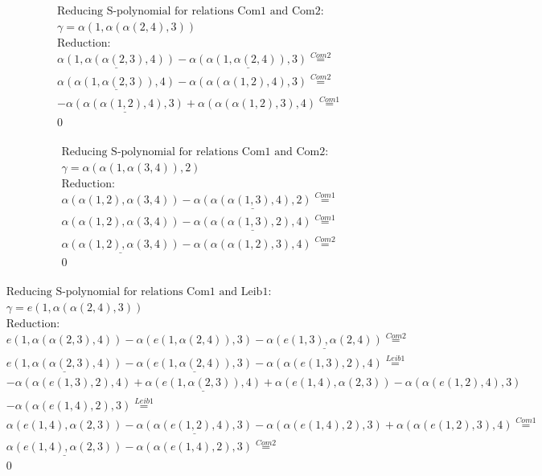 \documentclass[11pt]{amsart}
\begin{document}
\begin{align*} 
& \text{Reducing S-polynomial for relations Com1 and Com2:} \\ 
& \gamma = \alpha(1,\alpha(\alpha(2,4),3)) \\ 
& \text{Reduction}: \\&\underline{\alpha(1,\alpha(\alpha(2,3),4))} - \underline{\alpha(\alpha(1,\alpha(2,4)),3)} \stackrel{ Com2 }{=}  \\ 
&\underline{\alpha(\alpha(1,\alpha(2,3)),4)} - \alpha(\alpha(\alpha(1,2),4),3) \stackrel{ Com2 }{=}  \\ 
& - \underline{\alpha(\alpha(\alpha(1,2),4),3)} + \alpha(\alpha(\alpha(1,2),3),4) \stackrel{ Com1 }{=}  \\ 
&0\\ 
\end{align*} 
 
\begin{align*} 
& \text{Reducing S-polynomial for relations Com1 and Com2:} \\ 
& \gamma = \alpha(\alpha(1,\alpha(3,4)),2) \\ 
& \text{Reduction}: \\&\alpha(\alpha(1,2),\alpha(3,4)) - \underline{\alpha(\alpha(\alpha(1,3),4),2)} \stackrel{ Com1 }{=}  \\ 
&\alpha(\alpha(1,2),\alpha(3,4)) - \underline{\alpha(\alpha(\alpha(1,3),2),4)} \stackrel{ Com1 }{=}  \\ 
&\underline{\alpha(\alpha(1,2),\alpha(3,4))} - \alpha(\alpha(\alpha(1,2),3),4) \stackrel{ Com2 }{=}  \\ 
&0\\ 
\end{align*} 
 
\begin{align*} 
& \text{Reducing S-polynomial for relations Com1 and Leib1:} \\ 
& \gamma = e(1,\alpha(\alpha(2,4),3)) \\ 
& \text{Reduction}: \\&e(1,\alpha(\alpha(2,3),4)) - \alpha(e(1,\alpha(2,4)),3) - \underline{\alpha(e(1,3),\alpha(2,4))} \stackrel{ Com2 }{=}  \\ 
&\underline{e(1,\alpha(\alpha(2,3),4))} - \underline{\alpha(e(1,\alpha(2,4)),3)} - \alpha(\alpha(e(1,3),2),4) \stackrel{ Leib1 }{=}  \\ 
& - \alpha(\alpha(e(1,3),2),4) + \underline{\alpha(e(1,\alpha(2,3)),4)} + \alpha(e(1,4),\alpha(2,3)) - \alpha(\alpha(e(1,2),4),3)\\ 
 &  - \alpha(\alpha(e(1,4),2),3) \stackrel{ Leib1 }{=}  \\ 
&\alpha(e(1,4),\alpha(2,3)) - \underline{\alpha(\alpha(e(1,2),4),3)} - \alpha(\alpha(e(1,4),2),3) + \alpha(\alpha(e(1,2),3),4) \stackrel{ Com1 }{=}  \\ 
&\underline{\alpha(e(1,4),\alpha(2,3))} - \alpha(\alpha(e(1,4),2),3) \stackrel{ Com2 }{=}  \\ 
&0\\ 
\end{align*} 
 
\end{document}
